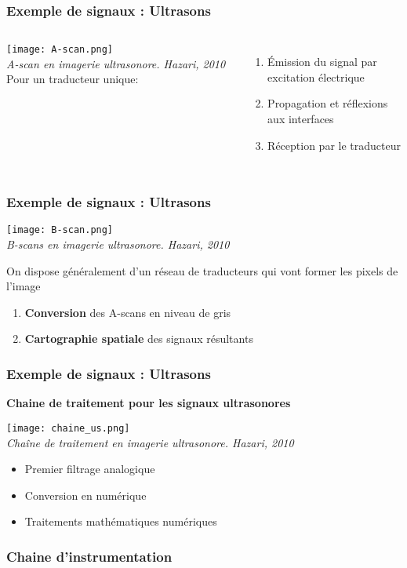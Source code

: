 \documentclass{beamer}
\begin{document}
\begin{frame}
\frametitle{Exemple de signaux : Ultrasons}
\begin{columns}
\column{60mm}
\texttt{[image: A-scan.png]}\\
\textit{\footnotesize A-scan en imagerie ultrasonore. Hazari, 2010}
\column{60mm}
Pour un traducteur unique:
\vspace{0.2cm}
\begin{enumerate}
\item<2-> \'Emission du signal par excitation électrique
\vspace{0.2cm}
\item<3-> Propagation et réflexions aux interfaces 
\vspace{0.2cm}
\item<4-> Réception par le traducteur
\end{enumerate}
\vspace{0.2cm}
\end{columns}
\end{frame}

\begin{frame}
\frametitle{Exemple de signaux : Ultrasons}
\begin{center}
\texttt{[image: B-scan.png]}\\
\textit{\footnotesize B-scans en imagerie ultrasonore. Hazari, 2010}\\
\end{center}
On dispose généralement d'un réseau de traducteurs qui vont former les pixels de l'image\\
\vspace{0.2cm}
\begin{enumerate}
\item<2-> \textbf{Conversion} des A-scans en niveau de gris
\vspace{0.2cm}
\item<3-> \textbf{Cartographie spatiale} des signaux résultants 
\end{enumerate}
\vspace{0.2cm}

\end{frame}

\begin{frame}
\frametitle{Exemple de signaux : Ultrasons}
\textbf{Chaine de traitement pour les signaux ultrasonores}\\
\begin{center}
\texttt{[image: chaine\_us.png]}\\
\textit{\footnotesize Chaîne de traitement en imagerie ultrasonore. Hazari, 2010}\\
\end{center}
\begin{itemize}
\item<2-> Premier filtrage analogique 
\item<3-> Conversion en numérique
\item<4-> Traitements mathématiques numériques 
\end{itemize}
\end{frame}

\begin{frame}
\frametitle{Chaine d'instrumentation}


\end{frame}

\end{document}
